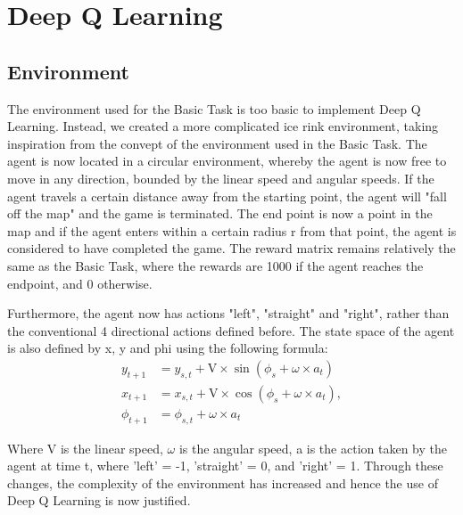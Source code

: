 \renewcommand{\thesection}{Advanced Task}
\section{Deep Q Learning}
\subsection{Environment}
The environment used for the Basic Task is too basic to implement Deep Q Learning. Instead, we created a more complicated ice rink environment, taking inspiration from the convept of the environment used in the Basic Task. The agent is now located in a circular environment, whereby the agent is now free to move in any direction, bounded by the linear speed and angular speeds.  If the agent travels a certain distance away from the starting point, the agent will "fall off the map" and the game is terminated. The end point is now a point in the map and if the agent enters within a certain radius r from that point, the agent is considered to have completed the game. The reward matrix remains relatively the same as the Basic Task, where the rewards are 1000 if the agent reaches the endpoint, and 0 otherwise.

Furthermore, the agent now has actions "left", "straight" and "right", rather than the conventional 4 directional actions defined before. The state space of the agent is also defined by x, y and phi using the following formula:
\begin{align}
    y_{t+1} &= y_{s,t} + \text{V} \times \sin(\phi_s + \omega \times a_t) \label{something} \\
    x_{t+1} &= x_{s,t} + \text{V} \times \cos(\phi_s + \omega \times a_t), \\
    \phi_{t+1} &= \phi_{s,t} + \omega \times a_t
\end{align}

Where V is the linear speed, $\omega$ is the angular speed, a is the action taken by the agent at time t, where 'left' = -1, 'straight' = 0, and 'right' = 1. Through these changes, the complexity of the environment has increased and hence the use of Deep Q Learning is now justified.

